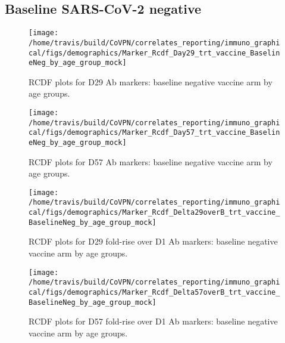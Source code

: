 \documentclass[]{book}
\theoremstyle{definition}
\theoremstyle{definition}
\theoremstyle{definition}
\newcommand{\1}{\mathbbm{1}}
\begin{document}
\hypertarget{baseline-sars-cov-2-negative-4}{%
\subsection{Baseline SARS-CoV-2 negative}\label{baseline-sars-cov-2-negative-4}}

\begin{figure}[H]

{\centering \texttt{[image: /home/travis/build/CoVPN/correlates\_reporting/immuno\_graphical/figs/demographics/Marker\_Rcdf\_Day29\_trt\_vaccine\_BaselineNeg\_by\_age\_group\_mock]} 

}

\caption{RCDF plots for D29 Ab markers: baseline negative vaccine arm by age groups.}\label{fig:unnamed-chunk-55}
\end{figure}

\begin{figure}[H]

{\centering \texttt{[image: /home/travis/build/CoVPN/correlates\_reporting/immuno\_graphical/figs/demographics/Marker\_Rcdf\_Day57\_trt\_vaccine\_BaselineNeg\_by\_age\_group\_mock]} 

}

\caption{RCDF plots for D57 Ab markers: baseline negative vaccine arm by age groups.}\label{fig:unnamed-chunk-56}
\end{figure}

\begin{figure}[H]

{\centering \texttt{[image: /home/travis/build/CoVPN/correlates\_reporting/immuno\_graphical/figs/demographics/Marker\_Rcdf\_Delta29overB\_trt\_vaccine\_BaselineNeg\_by\_age\_group\_mock]} 

}

\caption{RCDF plots for D29 fold-rise over D1 Ab markers: baseline negative vaccine arm by age groups.}\label{fig:unnamed-chunk-57}
\end{figure}

\begin{figure}[H]

{\centering \texttt{[image: /home/travis/build/CoVPN/correlates\_reporting/immuno\_graphical/figs/demographics/Marker\_Rcdf\_Delta57overB\_trt\_vaccine\_BaselineNeg\_by\_age\_group\_mock]} 

}

\caption{RCDF plots for D57 fold-rise over D1 Ab markers: baseline negative vaccine arm by age groups.}\label{fig:unnamed-chunk-58}
\end{figure}
\end{document}
